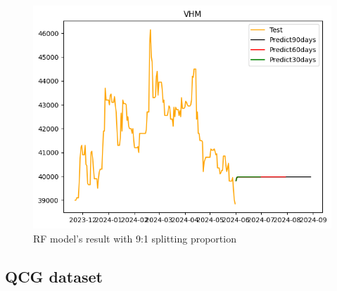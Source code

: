 \documentclass{ieeeojies}
\begin{document}
  \begin{figure}[H]
    \centering
    \begin{minipage}{0.8\linewidth}
      \centering
          \includegraphics[width=\linewidth]{bibliography/Figure/VHMRF_9-1.png}
      \caption{RF model’s result with 9:1 splitting proportion}
      \label{fig28}
    \end{minipage}
  \end{figure}
\subsection{QCG dataset} 
\end{document}
